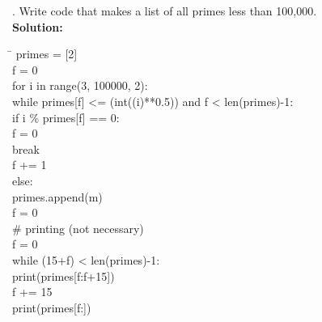 \documentclass{article}
\newenvironment{code}{\begin{tcolorbox}\ttfamily}{\end{tcolorbox}}
\begin{document}
. Write code that makes a list of all primes less than 100,000.\\
\noindent \textbf{Solution:}
\begin{code}
\begin{tabbing}
	\hspace{5 cm} \= \hspace{5 cm} \kill
	primes = [2]\\
	f = 0\\
	for i in range(3, 100000, 2):\\
	    \hspace{2 em}while primes[f] <= (int((i)**0.5)) and f < len(primes)-1:\\
		\hspace{4 em}if i \% primes[f] == 0:\\
		    \hspace{6 em}f = 0\\
	            \hspace{6 em}break\\
		\hspace{4 em}f += 1\\
	    \hspace{2 em}else:\\
	        \hspace{4 em}primes.append(m)\\
	        \hspace{4 em}f = 0\\
	# printing (not necessary)\\
	f = 0\\
	while (15+f) < len(primes)-1:\\
	    \hspace{2 em}print(primes[f:f+15])\\
	    \hspace{2 em}f += 15\\
	print(primes[f:])
\end{tabbing}
\end{code}
\end{document}
